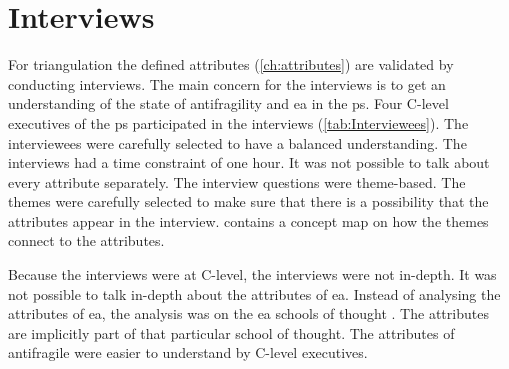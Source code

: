 \chapter{Interviews}
\label{ch:interviews}
For triangulation the defined \glspl{attribute} (\cref{ch:attributes}) are validated by conducting interviews. The main concern for the interviews is to get an understanding of the state of \gls{antifragility} and \acrshort{ea} in the \gls{ps}. Four C-level executives of the \gls{ps} participated in the interviews (\cref{tab:Interviewees}). The interviewees were carefully selected to have a balanced understanding. The interviews had a time constraint of one hour. It was not possible to talk about every \gls{attribute} separately. The interview questions were theme-based. The themes were carefully selected to make sure that there is a possibility that the \glspl{attribute} appear in the interview.  contains a concept map on how the themes connect to the \glspl{attribute}.
\begin{table}[H]
	\centering
	\caption[Interviewees]{Interviewees}%
	\label{tab:Interviewees}%
\end{table}
Because the interviews were at C-level, the interviews were not in-depth. It was not possible to talk in-depth about the attributes of \acrshort{ea}. Instead of analysing the \glspl{attribute} of \acrshort{ea}, the analysis was on the \acrshort{ea} schools of thought \parencite{Lapalme2012}. The attributes are implicitly part of that particular school of thought. The attributes of \gls{antifragile} were easier to understand by C-level executives.

